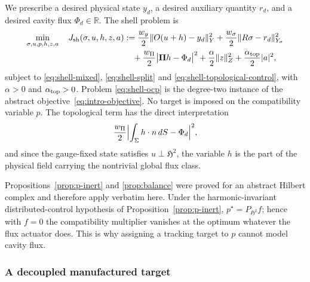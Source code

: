 \documentclass{article}
\newcommand{\R} {\mathbb R}
\newcommand{\HH}{\mathfrak H}
\newcommand{\Piop}{\boldsymbol\Pi}
\newcommand{\norm}[1]{\lVert #1\rVert}
\begin{document}
We prescribe a desired physical state $y_d$, a desired auxiliary
quantity $r_d$, and a desired cavity flux $\Phi_d\in\R$. The shell
problem is
\begin{equation}\label{eq:shell-ocp}
\begin{aligned}
  \min_{\sigma,u,p,h,z,a}\quad
  J_{\rm sh}(\sigma,u,h,z,a)
  &:=\frac{w_y}{2}\norm{O(u+h)-y_d}_Y^2
    +\frac{w_\sigma}{2}\norm{R\sigma-r_d}_{Y_\sigma}^2\\
  &\quad+\frac{w_\Pi}{2}\bigl|\Piop h-\Phi_d\bigr|^2
    +\frac{\alpha}{2}\norm{z}_Z^2
    +\frac{\alpha_{\rm top}}{2}|a|^2,
\end{aligned}
\end{equation}
subject to \eqref{eq:shell-mixed}, \eqref{eq:shell-split} and
\eqref{eq:shell-topological-control}, with $\alpha>0$ and
$\alpha_{\rm top}>0$. Problem \eqref{eq:shell-ocp} is the degree-two
instance of the abstract objective~\eqref{eq:intro-objective}. No target is imposed on the compatibility
variable $p$. The topological term has the direct interpretation
\[
  \frac{w_\Pi}{2}\Bigl|\int_\Sigma h\cdot n\,dS-\Phi_d\Bigr|^2 ,
\]
and since the gauge-fixed state satisfies $u\perp\HH^2$, the variable
$h$ is the part of the physical field carrying the nontrivial global
flux class.
 
Propositions~\ref{prop:p-inert} and \ref{prop:balance} were proved for
an abstract Hilbert complex and therefore apply verbatim here.  Under the
harmonic-invariant distributed-control hypothesis of Proposition~\ref{prop:p-inert},
$p^\star=P_{\HH^2}f$; hence with $f=0$ the compatibility multiplier vanishes
at the optimum whatever the flux actuator does.  This is why assigning a
tracking target to $p$ cannot model cavity flux.
 
\subsubsection{A decoupled manufactured target}
\label{sec:shell-manufactured}
 
\end{document}
